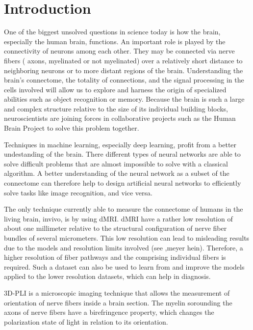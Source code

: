 \setcounter{chapter}{0}
\chapter{Introduction}
\label{sec:intro}
% 
One of the biggest unsolved questions in science today is how the brain, especially the human brain, functions.
An important role is played by the connectivity of neurons among each other.
They may be connected via nerve fibers (\ie{} axons, myelinated or not myelinated) over a relatively short distance to neighboring neurons or to more distant regions of the brain.
Understanding the brain's connectome, \ie{} the totality of connections, and the signal processing in the cells involved will allow us to explore and harness the origin of specialized abilities such as object recognition or memory.
Because the brain is such a large and complex structure relative to the size of its individual building blocks, neuroscientists are joining forces in collaborative projects such as the Human Brain Project to solve this problem together. \cite{Markram2006, Shen2012, Amunts2013, Amunts2016}
\par
% 
Techniques in machine learning, especially deep learning, profit from a better undestanding of the brain. There different types of neural networks are able to solve difficult problems that are almost impossible to solve with a classical algorithm.
A better understanding of the neural network as a subset of the connectome can therefore help to design artificial neural networks to efficiently solve tasks like image recognition, and vice versa. \cite{murphy2013machine, Goodfellow-et-al-2016}
\par
% 
The only technique currently able to measure the connectome of humans in the living brain, \ie{} invivo, is by using \ac{dMRI}.
\ac{dMRI} have a rather low resolution of about one millimeter relative to the structural configuration of nerve fiber bundles of several micrometers.
This low resolution can lead to misleading results due to the models and resolution limits involved (see ,meyer hein).
Therefore, a higher resolution of fiber pathways and the comprising individual fibers is required.
Such a dataset can also be used to learn from and improve the models applied to the lower resolution datasets, which can help in diagnosis. \cite{MaierHein2017, Schilling2021, Yendiki2021}
\par
% 
\ac{3D-PLI} is a microscopic imaging technique that allows the measurement of orientation of nerve fibers inside a brain section.
The myelin sorounding the axons of nerve fibers have a birefringence property, which changes the polarization state of light in relation to its orientation.
